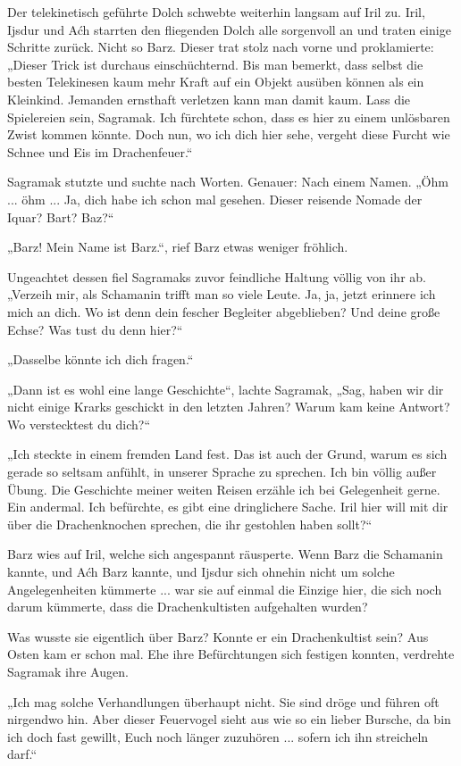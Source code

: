 Der telekinetisch geführte Dolch schwebte weiterhin langsam auf Iril zu. Iril, Ijsdur und Aćh starrten den fliegenden Dolch alle sorgenvoll an und traten einige Schritte zurück. Nicht so Barz. Dieser trat stolz nach vorne und proklamierte: „Dieser Trick ist durchaus einschüchternd. Bis man bemerkt, dass selbst die besten Telekinesen kaum mehr Kraft auf ein Objekt ausüben können als ein Kleinkind. Jemanden ernsthaft verletzen kann man damit kaum. Lass die Spielereien sein, Sagramak. Ich fürchtete schon, dass es hier zu einem unlösbaren Zwist kommen könnte. Doch nun, wo ich dich hier sehe, vergeht diese Furcht wie Schnee und Eis im Drachenfeuer.“

Sagramak stutzte und suchte nach Worten. Genauer: Nach einem Namen. „Öhm ... öhm ... Ja, dich habe ich schon mal gesehen. Dieser reisende Nomade der Iquar? Bart? Baz?“

„Barz! Mein Name ist Barz.“, rief Barz etwas weniger fröhlich.

Ungeachtet dessen fiel Sagramaks zuvor feindliche Haltung völlig von ihr ab. „Verzeih mir, als Schamanin trifft man so viele Leute. Ja, ja, jetzt erinnere ich mich an dich. Wo ist denn dein fescher Begleiter abgeblieben? Und deine große Echse? Was tust du denn hier?“

„Dasselbe könnte ich dich fragen.“

„Dann ist es wohl eine lange Geschichte“, lachte Sagramak, „Sag, haben wir dir nicht einige Krarks geschickt in den letzten Jahren? Warum kam keine Antwort? Wo verstecktest du dich?“

„Ich steckte in einem fremden Land fest. Das ist auch der Grund, warum es sich gerade so seltsam anfühlt, in unserer Sprache zu sprechen. Ich bin völlig außer Übung. Die Geschichte meiner weiten Reisen erzähle ich bei Gelegenheit gerne. Ein andermal. Ich befürchte, es gibt eine dringlichere Sache. Iril hier will mit dir über die Drachenknochen sprechen, die ihr gestohlen haben sollt?“

Barz wies auf Iril, welche sich angespannt räusperte. Wenn Barz die Schamanin kannte, und Aćh Barz kannte, und Ijsdur sich ohnehin nicht um solche Angelegenheiten kümmerte ... war sie auf einmal die Einzige hier, die sich noch darum kümmerte, dass die Drachenkultisten aufgehalten wurden?

Was wusste sie eigentlich über Barz? Konnte er ein Drachenkultist sein? Aus Osten kam er schon mal. Ehe ihre Befürchtungen sich festigen konnten, verdrehte Sagramak ihre Augen.

„Ich mag solche Verhandlungen überhaupt nicht. Sie sind dröge und führen oft nirgendwo hin. Aber dieser Feuervogel sieht aus wie so ein lieber Bursche, da bin ich doch fast gewillt, Euch noch länger zuzuhören ... sofern ich ihn streicheln darf.“


